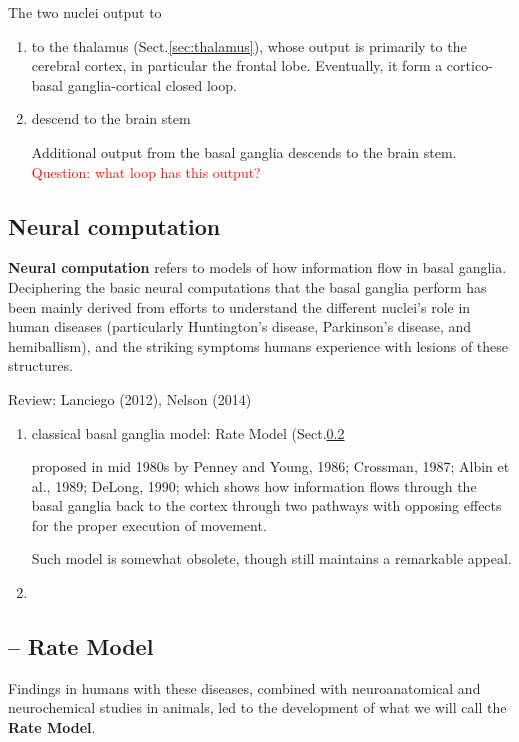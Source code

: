 The two nuclei output to
\begin{enumerate}
  \item to the thalamus (Sect.\ref{sec:thalamus}), whose output is primarily to
  the cerebral cortex, in particular the frontal lobe. Eventually, it form a
  cortico-basal ganglia-cortical closed loop.


  \item descend to the brain stem  

Additional output from the basal ganglia descends to the brain stem. 
\textcolor{red}{Question: what loop has this output?}
\end{enumerate}




\subsection{Neural computation}
\label{sec:basal-ganglia-neural-computation}

{\bf Neural computation} refers to models of how information flow in basal
ganglia. Deciphering the basic neural computations that the basal ganglia
perform has been mainly derived from efforts to understand the different
nuclei's role in human diseases (particularly Huntington's disease, Parkinson's
disease, and hemiballism), and the striking symptoms humans experience with
lesions of these structures.

Review: Lanciego (2012), Nelson (2014)
\begin{enumerate}
  \item classical basal ganglia model: Rate Model
  (Sect.\ref{sec:RateModel-BG}
  
  proposed in mid 1980s by Penney and Young, 1986; Crossman, 1987; Albin et al.,
  1989; DeLong, 1990; which shows how information flows through the basal
  ganglia back to the cortex through two pathways with opposing effects for the
  proper execution of movement.
  
  Such model is somewhat obsolete, though still maintains a remarkable appeal.
  
  \item 
\end{enumerate}

\subsection{-- Rate Model}
\label{sec:RateModel-BG}

Findings in humans with these diseases, combined with neuroanatomical and
neurochemical studies in animals, led to the development of what we will call
the {\bf Rate Model}. 

